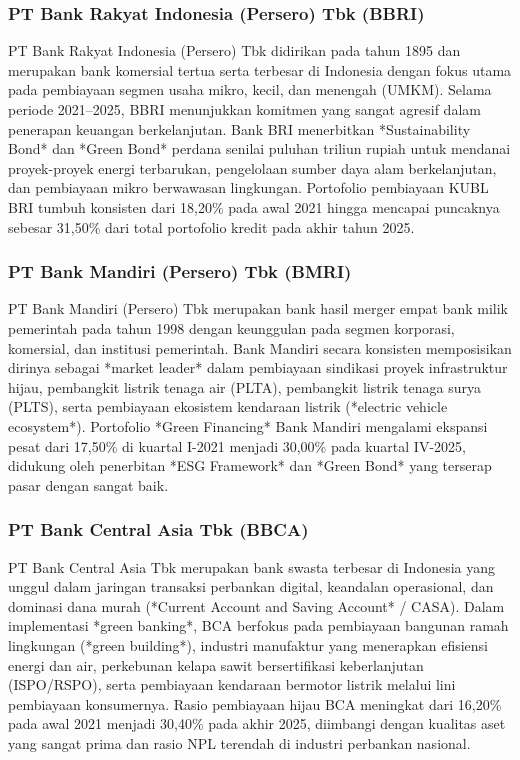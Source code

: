 \documentclass[12pt,a4paper]{article}
\numberwithin{equation}{section}
\begin{document}
\subsubsection{PT Bank Rakyat Indonesia (Persero) Tbk (BBRI)}
\noindent
PT Bank Rakyat Indonesia (Persero) Tbk didirikan pada tahun 1895 dan merupakan bank komersial tertua serta terbesar di Indonesia dengan fokus utama pada pembiayaan segmen usaha mikro, kecil, dan menengah (UMKM). Selama periode 2021--2025, BBRI menunjukkan komitmen yang sangat agresif dalam penerapan keuangan berkelanjutan. Bank BRI menerbitkan *Sustainability Bond* dan *Green Bond* perdana senilai puluhan triliun rupiah untuk mendanai proyek-proyek energi terbarukan, pengelolaan sumber daya alam berkelanjutan, dan pembiayaan mikro berwawasan lingkungan. Portofolio pembiayaan KUBL BRI tumbuh konsisten dari 18,20\% pada awal 2021 hingga mencapai puncaknya sebesar 31,50\% dari total portofolio kredit pada akhir tahun 2025.

\subsubsection{PT Bank Mandiri (Persero) Tbk (BMRI)}
\noindent
PT Bank Mandiri (Persero) Tbk merupakan bank hasil merger empat bank milik pemerintah pada tahun 1998 dengan keunggulan pada segmen korporasi, komersial, dan institusi pemerintah. Bank Mandiri secara konsisten memposisikan dirinya sebagai *market leader* dalam pembiayaan sindikasi proyek infrastruktur hijau, pembangkit listrik tenaga air (PLTA), pembangkit listrik tenaga surya (PLTS), serta pembiayaan ekosistem kendaraan listrik (*electric vehicle ecosystem*). Portofolio *Green Financing* Bank Mandiri mengalami ekspansi pesat dari 17,50\% di kuartal I-2021 menjadi 30,00\% pada kuartal IV-2025, didukung oleh penerbitan *ESG Framework* dan *Green Bond* yang terserap pasar dengan sangat baik.

\subsubsection{PT Bank Central Asia Tbk (BBCA)}
\noindent
PT Bank Central Asia Tbk merupakan bank swasta terbesar di Indonesia yang unggul dalam jaringan transaksi perbankan digital, keandalan operasional, dan dominasi dana murah (*Current Account and Saving Account* / CASA). Dalam implementasi *green banking*, BCA berfokus pada pembiayaan bangunan ramah lingkungan (*green building*), industri manufaktur yang menerapkan efisiensi energi dan air, perkebunan kelapa sawit bersertifikasi keberlanjutan (ISPO/RSPO), serta pembiayaan kendaraan bermotor listrik melalui lini pembiayaan konsumernya. Rasio pembiayaan hijau BCA meningkat dari 16,20\% pada awal 2021 menjadi 30,40\% pada akhir 2025, diimbangi dengan kualitas aset yang sangat prima dan rasio NPL terendah di industri perbankan nasional.
\end{document}
